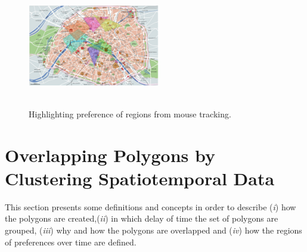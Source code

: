 \documentclass[runningheads,a4paper]{llncs}
\begin{document}
\begin{figure}
{    \includegraphics[width=5.8cm]{imgs/adbis2_map3.png}
       \label{fig:paris3} 
  } %
  \\ %
  \\ %
  \caption{Highlighting preference of regions from mouse tracking. }
  \label{fig:paris}
\end{figure} %


\section{Overlapping Polygons by Clustering Spatiotemporal Data}
\label{sec:overpolygons}

This section presents some definitions and concepts in order to describe (\textit{i}) how the polygons are created,(\textit{ii}) in which delay of time the set of polygons are grouped, (\textit{iii})  why and how the polygons are overlapped and  (\textit{iv}) how the regions of preferences over time are defined.
\end{document}
